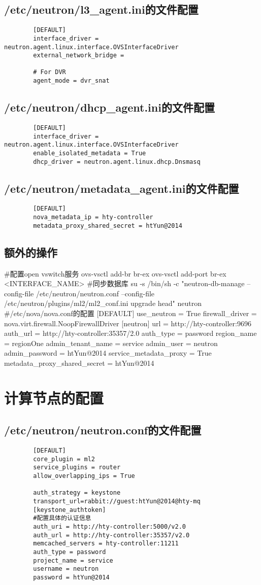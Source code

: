 \documentclass[a4paper,left=1.5cm,right=1.5cm,11pt]{article}
\begin{document}
\subsection{/etc/neutron/l3_agent.ini的文件配置}
	\begin{lstlisting}
		[DEFAULT]
		interface_driver = neutron.agent.linux.interface.OVSInterfaceDriver
		external_network_bridge =
		
		# For DVR
		agent_mode = dvr_snat
	\end{lstlisting}
\subsection{/etc/neutron/dhcp_agent.ini的文件配置}
	\begin{lstlisting}
		[DEFAULT]
		interface_driver = neutron.agent.linux.interface.OVSInterfaceDriver
		enable_isolated_metadata = True
		dhcp_driver = neutron.agent.linux.dhcp.Dnsmasq
	\end{lstlisting}
\subsection{/etc/neutron/metadata_agent.ini的文件配置}
	\begin{lstlisting}
		[DEFAULT]
		nova_metadata_ip = hty-controller
		metadata_proxy_shared_secret = htYun@2014
	\end{lstlisting}

\subsection{额外的操作}
	#配置open vswitch服务
	ovs-vsctl add-br br-ex
	ovs-vsctl add-port br-ex <INTERFACE_NAME>
	#同步数据库
	su -s /bin/sh -c "neutron-db-manage --config-file /etc/neutron/neutron.conf --config-file /etc/neutron/plugins/ml2/ml2_conf.ini upgrade head" neutron
	#/etc/nova/nova.conf的配置
	[DEFAULT]
	use_neutron = True
	firewall_driver = nova.virt.firewall.NoopFirewallDriver
	[neutron]
	url = http://hty-controller:9696
	auth_url = http://hty-controller:35357/2.0
	auth_type = password
	region_name = regionOne
	admin_tenant_name = service
	admin_user = neutron
	admin_password = htYun@2014
	service_metadata_proxy = True
	metadata_proxy_shared_secret = htYun@2014

\section{计算节点的配置}
\subsection{/etc/neutron/neutron.conf的文件配置}
	\begin{lstlisting}
		[DEFAULT]
		core_plugin = ml2
		service_plugins = router
		allow_overlapping_ips = True

		auth_strategy = keystone
		transport_url=rabbit://guest:htYun@2014@hty-mq
		[keystone_authtoken]
		#配置具体的认证信息
		auth_uri = http://hty-controller:5000/v2.0
		auth_url = http://hty-controller:35357/v2.0
		memcached_servers = hty-controller:11211
		auth_type = password
		project_name = service
		username = neutron
		password = htYun@2014
	\end{lstlisting}
\end{document}
